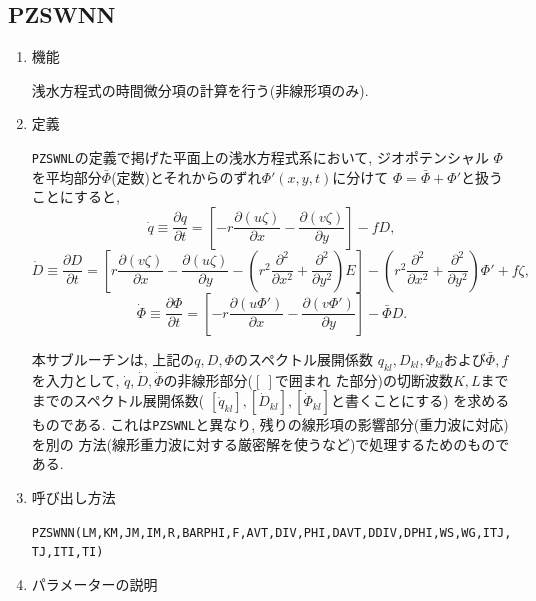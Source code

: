 \documentclass[a4j,fleqn]{jarticle}
\begin{document}
\subsection{PZSWNN}

\begin{enumerate}

\item 機能 

浅水方程式の時間微分項の計算を行う(非線形項のみ).

\item 定義

{\tt PZSWNL}の定義で掲げた平面上の浅水方程式系において, ジオポテンシャル
$\Phi$を平均部分$\bar\Phi$(定数)とそれからのずれ$\Phi'(x,y,t)$に分けて
$\Phi=\bar\Phi+\Phi'$と扱うことにすると, 
\begin{equation}
\dot{q}\equiv\frac{\partial q}{\partial t}
=\left[-r\frac{\partial(u\zeta)}{\partial x}
 -\frac{\partial(v\zeta)}{\partial y}\right]-fD,
\end{equation}
\begin{equation}
\dot{D}\equiv\frac{\partial D}{\partial t}
=\left[r\frac{\partial(v\zeta)}{\partial x}
-\frac{\partial(u\zeta)}{\partial y}
 -\left(r^2\frac{\partial^2}{\partial x^2}
  +\frac{\partial^2}{\partial y^2}\right) E\right]
 -\left(r^2\frac{\partial^2}{\partial x^2}
  +\frac{\partial^2}{\partial y^2}\right)\Phi'+f\zeta,
\end{equation}
\begin{equation}
\dot{\Phi}\equiv\frac{\partial \Phi}{\partial t}
=\left[-r\frac{\partial(u\Phi')}{\partial x}
-\frac{\partial(v\Phi')}{\partial y}\right]-\bar\Phi D.
\end{equation}

本サブルーチンは, 上記の$q,D,\Phi$のスペクトル展開係数
$q_{kl},D_{kl},\Phi_{kl}$および$\bar\Phi,f$を入力として,
$\dot{q},\dot{D},\dot{\Phi}$の非線形部分($\left[\ \right]$で囲まれ
た部分)の切断波数$K,L$までまでのスペクトル展開係数(
$[ \dot{q}_{kl}],[\dot{D}_{kl}],[\dot{\Phi}_{kl}]$と書くことにする)
を求めるものである.
これは{\tt PZSWNL}と異なり, 残りの線形項の影響部分(重力波に対応)を別の
方法(線形重力波に対する厳密解を使うなど)で処理するためのものである.

\item 呼び出し方法 

{\tt PZSWNN(LM,KM,JM,IM,R,BARPHI,F,AVT,DIV,PHI,DAVT,DDIV,DPHI,WS,WG,ITJ,TJ,ITI,TI)}

\item パラメーターの説明


\end{enumerate}
\end{document}
